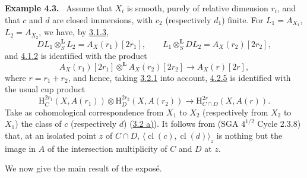 \documentclass[11pt]{article}
\newenvironment{statement}[1]{\par\medskip\noindent\textbf{#1.}\ }{\par\medskip}
\renewcommand{\H}{\mathrm{H}}
\providecommand{\cl}{\operatorname{cl}}
\providecommand{\cl}{\operatorname{cl}}
\providecommand{\cl}{\operatorname{cl}}
\begin{document}
\label{sga5:III:example:4.3}\begin{statement}{Example 4.3}
Assume that $X_i$ is smooth, purely of relative dimension $r_i$, and that $c$ and $d$ are closed immersions, with $c_2$ (respectively $d_1$) finite. For $L_1=A_{X_1}$, $L_2=A_{X_2}$, we have, by \hyperref[sga5:III:equation:3.1.3]{3.1.3},
\[
DL_1\otimes_S^{\mathbf L}L_2=A_X(r_1)[2r_1],\qquad
L_1\otimes_S^{\mathbf L}DL_2=A_X(r_2)[2r_2],
\]
and \hyperref[sga5:III:equation:4.1.2]{4.1.2} is identified with the product
\[
A_X(r_1)[2r_1]\otimes^{\mathbf L}A_X(r_2)[2r_2]\longrightarrow A_X(r)[2r],
\]
where $r=r_1+r_2$, and hence, taking \hyperref[sga5:III:equation:3.2.1]{3.2.1} into account, \hyperref[sga5:III:equation:4.2.5]{4.2.5} is identified with the usual cup product
\[
\H_C^{2r_1}(X,A(r_1))\otimes \H_D^{2r_2}(X,A(r_2))
\longrightarrow
\H_{C\cap D}^{2r}(X,A(r)).
\]
Take as cohomological correspondence from $X_1$ to $X_2$ (respectively from $X_2$ to $X_1$) the class of $c$ (respectively $d$) (\hyperref[sga5:III:subsection:3.2]{3.2 a)}). It follows from (SGA $4^{1/2}$ Cycle 2.3.8) that, at an isolated point $z$ of $C\cap D$, $\langle \cl(c),\cl(d)\rangle_z$ is nothing but the image in $A$ of the intersection multiplicity of $C$ and $D$ at $z$.
\end{statement}

We now give the main result of the exposé.
\end{document}
